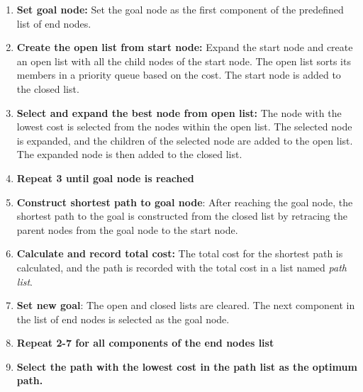 \begin{enumerate}
\item \textbf{Set goal node:} Set the goal node as the first component of the predefined list of end nodes. 
\item \textbf{Create the open list from start node:} Expand the start node and create an open list with all the child nodes of the start node. The open list sorts its members in a priority queue based on the cost. The start node is added to the closed list.
\item \textbf{Select and expand the best node from open list:} The node with the lowest cost is selected from the nodes within the open list. The selected node is expanded, and the children of the selected node are added to the open list. The expanded node is then added to the closed list.
\item \textbf{Repeat 3 until goal node is reached}
\item \textbf{Construct shortest path to goal node}: After reaching the goal node, the shortest path to the goal is constructed from the closed list by retracing the parent nodes from the goal node to the start node.
\item \textbf{Calculate and record total cost:} The total cost for the shortest path is calculated, and the path is recorded with the total cost in a list named \textit{path list}.
\item \textbf{Set new goal}: The open and closed lists are cleared. The next component in the list of end nodes is selected as the goal node.
\item \textbf{Repeat 2-7 for all components of the end nodes list}
\item \textbf{Select the path with the lowest cost in the path list as the optimum path.}
\end{enumerate}
